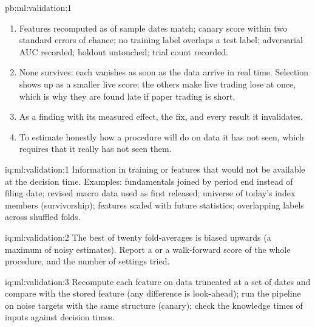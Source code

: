 \begin{solution}{pb:ml:validation:1}
\begin{enumerate}
selecting the best seed on the test 0.13 points; truncation, canary, fold-overlap and holdout catch them in that order.
\item Features recomputed as of sample dates match; canary score within two standard errors of chance; no training
label overlaps a test label; adversarial AUC recorded; holdout untouched; trial count recorded.
\item None survives: each vanishes as soon as the data arrive in real time. Selection shows up as a smaller live score;
the others make live trading lose at once, which is why they are found late if paper trading is short.
\item As a finding with its measured effect, the fix, and every result it invalidates.
\item To estimate honestly how a procedure will do on data it has not seen, which requires that it really has not seen
them.
\end{enumerate}
\end{solution}

\begin{solution}{iq:ml:validation:1}
Information in training or features that would not be available at the decision time. Examples: fundamentals joined by
period end instead of filing date; revised macro data used as first released; universe of today's index members
(survivorship); features scaled with future statistics; overlapping labels across shuffled folds.
\end{solution}

\begin{solution}{iq:ml:validation:2}
The best of twenty fold-averages is biased upwards (a maximum of noisy estimates). Report a  or a
walk-forward score of the whole procedure, and the number of settings tried.
\end{solution}

\begin{solution}{iq:ml:validation:3}
Recompute each feature on data truncated at a set of dates and compare with the stored feature (any difference is
look-ahead); run the pipeline on noise targets with the same structure (canary); check the knowledge times of inputs
against decision times.
\end{solution}

